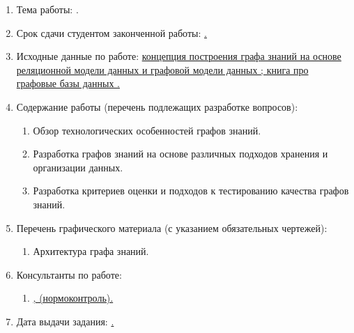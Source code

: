 \begin{enumerate}[1.]
	\item Тема работы: {\expandafter \ulined \thesisTitle.}
	\item Срок сдачи студентом законченной работы: \uline{\thesisDeadline.}
	\item Исходные данные по работе: \uline{концепция построения графа знаний на основе реляционной модели данных \cite{designing-a-graph-data-structure-in-a-relational-database} и графовой модели данных \cite{build-knowledge-graph-nlp-ontologies}; книга про графовые базы данных \cite{graph-databases-2nd}.}%
	\printbibliographyTask %
	\item Содержание работы (перечень подлежащих разработке вопросов):
	\begin{enumerate}[label=\theenumi\arabic*.]
		\item Обзор технологических особенностей графов знаний.
        \item Разработка графов знаний на основе различных подходов хранения и организации данных.
		\item Разработка критериев оценки и подходов к тестированию качества графов знаний.
	\end{enumerate}
	\item Перечень графического материала (с указанием обязательных чертежей):
	\begin{enumerate}[label=\theenumi\arabic*.]
		\item Архитектура графа знаний.
	\end{enumerate}
		\item Консультанты по работе:
		\begin{enumerate}[label=\theenumi\arabic*.]
		\item \uline{\emakefirstuc{\ConsultantNormDegree}, \ConsultantNorm{} (нормоконтроль).} %
	\end{enumerate}
		\item Дата выдачи задания: \uline{\thesisStartDate.}
\end{enumerate}

